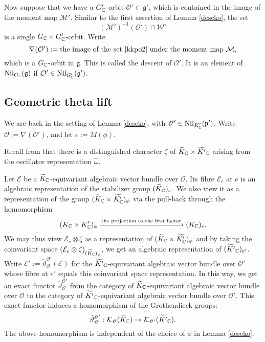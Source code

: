 \documentclass[lang = american]{ems-icm} %
\newcommand{\g}{\mathfrak g}
\newcommand{\p}{\mathfrak p}
\newcommand{\CE}{{\mathcal {E}}}
\newcommand{\CK}{{\mathcal {K}}}
\newcommand{\CM}{{\mathcal {M}}}
\newcommand{\CO}{{\mathcal {O}}}
\newcommand{\CW}{{\mathcal {W}}}
\newcommand{\sO}{\mathscr{O}}
\numberwithin{equation}{section}
\theoremstyle{remark}
\begin{document}
Now suppose that we have a $G'_{\mathbb{C}}$-orbit $\CO'\subset \g'$, which is contained in the image of the moment map $\CM'$. Similar to
the first assertion of Lemma \ref{descko}, the set
\begin{equation}\label{kkpo2}
  (\CM')^{-1}(\CO')\cap \CW^\circ
\end{equation}
is a single $G_{\mathbb{C}}\times G'_{\mathbb{C}}$-orbit.
Write
\[
 \nabla (\CO'):=\textrm{the image of the set \eqref{kkpo2} under the moment map  $\CM$,}
\]
which is a $ G_{\mathbb{C}}$-orbit in $\g$. This is called the descent of $\CO'$. It is an element of  $\mathrm{Nil}_{G_{\C}}(\g)$ if $\CO'\in \mathrm{Nil}_{G'_{\C}}(\g')$.



\subsection{Geometric theta lift}

We are back in the setting of Lemma \ref{descko}, with $\sO'\in \mathrm{Nil}_{K'_{\C}}(\p')$. Write $\sO:=\nabla(\sO')$, and let $e:=M(\phi)$.

Recall from \cite[Section 3.3]{BMSZ3} that there is a distinguished character
  $\zeta $ of $\widetilde{K}_{\mathbb{C}} \times \widetilde{K'}_{\mathbb{C}}$ arising from the oscillator representation $\widehat \omega$.

Let $\CE$ be a $\widetilde{K}_{\mathbb{C}}$-equivariant algebraic vector bundle over $\sO$. Its fibre
$\CE_{e}$ at $e$ is an algebraic representation of the stabilizer group $(\widetilde{K}_{\mathbb{C}})_{e}$. We also view it as a representation of the group
$(\widetilde{K}_{\mathbb{C}}\times \widetilde {K'_{\mathbb{C}}})_\phi$ via the pull-back through the homomorphism
\[
  (K_{\mathbb{C}}\times K'_{\mathbb{C}})_\phi\xrightarrow{\textrm{the projection to the first factor}} (K_{\mathbb{C}})_{e}.
\]
We may thus view $\CE_{e} \otimes \zeta$ as a representation of $(\widetilde{K}_{\mathbb{C}}\times \widetilde {K'_{\mathbb{C}}})_\phi$ and by taking the coinvariant space
$(\CE_{e} \otimes \zeta)_{ (\widetilde{K}_{\C})_\phi}$, we get an algebraic representation of $(\widetilde{K'}_{\mathbb{C}})_{e'}$. Write $\CE':= \check \vartheta_{\sO}^{\sO'}(\mathcal E)$ for the  $\widetilde{K'}_{\mathbb{C}}$-equivariant algebraic vector bundle over $\sO'$ whose fibre at $e'$ equals this coinvariant space representation. In this way, we get an exact functor $\check \vartheta_{\sO}^{\sO'}$ from the category of
$\widetilde{K}_{\mathbb{C}}$-equivariant algebraic vector bundle over $\sO$ to the category of $\widetilde{K'}_{\mathbb{C}}$-equivariant algebraic vector bundle  over $\sO'$. This exact functor induces a  homomorphism of the Grothendieck groups:
\[
   \check \vartheta_{\sO}^{\sO'}:  \CK_{\sO}(\widetilde{K}_{\C})\rightarrow  \CK_{\sO'}(\widetilde{K'}_{\C}).
\]
The above homomorphism is independent of the choice of $\phi$ in Lemma \ref{descko}.
\end{document}
